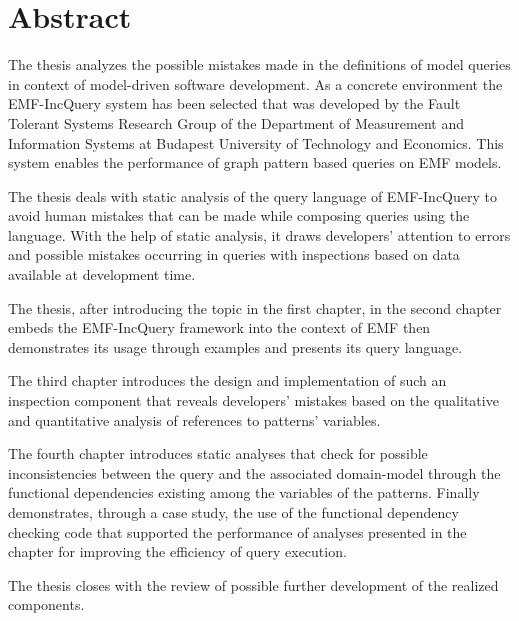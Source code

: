 \chapter*{Abstract}

The thesis analyzes the possible mistakes made in the definitions of model queries in context of model-driven software development.
As a concrete environment the EMF-IncQuery system has been selected that was developed by the Fault Tolerant Systems Research Group of the Department of Measurement and Information Systems at Budapest University of Technology and Economics.
This system enables the performance of graph pattern based queries on EMF models.

The thesis deals with static analysis of the query language of EMF-IncQuery to avoid human mistakes that can be made while composing queries using the language.
With the help of static analysis, it draws developers' attention to errors and possible mistakes occurring in queries with inspections based on data available at development time.

The thesis, after introducing the topic in the first chapter, in the second chapter embeds the EMF-IncQuery framework into the context of EMF then demonstrates its usage through examples and presents its query language.

The third chapter introduces the design and implementation of such an inspection component that reveals developers' mistakes based on the qualitative and quantitative analysis of references to patterns' variables.

The fourth chapter introduces static analyses that check for possible inconsistencies between the query and the associated domain-model through the functional dependencies existing among the variables of the patterns.
Finally demonstrates, through a case study, the use of the functional dependency checking code that supported the performance of analyses presented in the chapter for improving the efficiency of query execution. 

The thesis closes with the review of possible further development of the realized components.

\vfill
